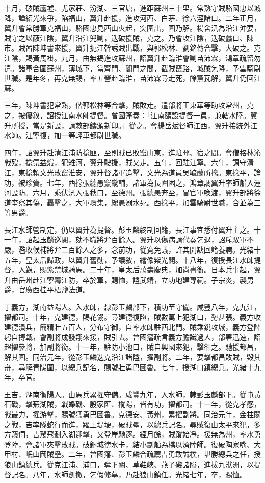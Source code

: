\begin{pinyinscope}
十月，破賊蘆墟、尤家莊、汾湖、三官塘，進距蘇州三十里。常熟守賊駱國忠以城降，譚紹光來爭，陷福山，翼升赴援，進攻河西、白茅、徐六涇諸口。二年正月，翼升會常勝軍克福山，駱國忠見西山火起，突圍出，圍乃解。楊舍汛為沿江沖要，賊守之以蔽江陰，翼升沿江兜剿，迭破援賊，克之。乃會攻江陰，迭破蠡口、陳市。賊酋陳坤書來援，翼升扼江幹誘賊出戰，與郭松林、劉銘傳合擊，大破之。克江陰，賜黃馬褂。九月，由無錫進攻蘇州，詔翼升赴臨淮會剿苗沛霖，鴻章疏留勿遣。諸軍合圍蘇州，薄城下，當齊門、閶門之間，截賊竄路，城賊乞降，予雲騎尉世職。是年冬，再克無錫，率五營赴臨淮，苗沛霖尋走死，餘黨瓦解，翼升仍回江蘇。

三年，陳坤書犯常熟，偕郭松林等合擊，賊敗走。遣部將王東華等助攻常州，克之，被優敘，詔授江南水師提督。曾國籓奏：「江南額設提督一員，兼轄水陸。翼升所授，當是新設，請敕部鑄頒新印。」從之。會楊岳斌督師江西，翼升接統外江水師。江寧復，加一等輕車都尉世職。

四年，詔翼升赴清江浦防捻匪，至則賊已敗竄山東，進駐邳、宿之間。會僧格林沁戰歿，捻氛益熾，犯雉河，翼升駛援，賊又走。五年，回駐江寧。六年，調守清江，東捻賴文光敗竄淮安，翼升督諸軍追擊，文光為道員吳毓蘭所擒。東捻平，論功，被珍賚。七年，西捻張總愚竄畿輔，諸軍為長圍困之，鴻章調翼升率師船入運河設防。六月，乘伏汛入張秋口，至德州。張總愚奔至，冒官軍喚渡，翼升部將徐道奎察其偽，轟擊之，大軍環集，總愚溺水死。西捻平，加雲騎尉世職，合並為三等男爵。

長江水師營制定，仍以翼升為提督。彭玉麟終制回籍，長江事宜悉付翼升主之。十一年，詔起玉麟巡閱，劾不職將弁百餘人。翼升以傷病請代奏乞退，詔斥馭軍不嚴，濫收候補將弁二百餘人之多，念前功，從寬免議，許其開缺回籍養痾。光緒十五年，皇太后歸政，以翼升舊勛，予議敘，繪像紫光閣。十八年，復授長江水師提督，入覲，賜紫禁城騎馬。二十年，皇太后萬壽慶典，加尚書銜。日本兵事起，翼升由岳州赴江寧籌江防，卒於軍，賜恤，謚武靖，立功地建專祠。子宗炎，襲男爵，官廣西桂平梧鹽法道。

丁義方，湖南益陽人。入水師，隸彭玉麟部下，積功至守備。咸豐八年，克九江，擢都司。十年，克建德，賜花翎。尋建德復陷，賊數萬上犯湖口，勢甚張。義方收建德潰兵，簡精壯五百人，分布守御，自率水師駐西北門。賊乘銳攻城，義方登陴躬自搏戰，會副將成發翔來援，賊引去。曾國籓疏言義方膽識過人，部署迅速，詔超擢參將，加副將銜。十一年，駐防小池口，賊自興國來犯，擊卻之。馳援都昌，解其圍。同治元年，從彭玉麟迭克沿江諸隘，擢副將。二年，要擊都昌敗賊，毀其舟，尋解青陽圍，以總兵記名，賜號壯勇巴圖魯。七年，授湖口鎮總兵。光緒十九年，卒官。

王吉，湖南衡陽人。由馬兵累擢守備。咸豐九年，入水師，隸彭玉麟部下。從屯黃石磯，擊蕪湖賊，戰蟂磯、殷家匯、樅陽，皆有功，擢都司。十一年，從克孝感，戰最力，擢游擊，賜號猛勇巴圖魯。克德安、黃州，累擢副將。同治元年，金柱關之戰，吉率隊蛇行而進，躍上堤埂，破賊壘，以總兵記名。尋賊復由太平來犯，多方窺伺，吉駕飛劃入湖迎擊，又登岸馳逐。經月餘，賊蹤始凈。援無為州，率水勇登陸，會諸軍夾擊敗賊。破銅城徬水卡，結小劃船為橋以濟陸師。復破陶家嘴、大甲村、岷山岡賊壘。二年，曾國籓、彭玉麟合疏薦吉勇敢誠樸，堪勝總兵之任，授狼山鎮總兵。從克江浦、浦口，奪下關、草鞋峽、燕子磯諸隘，進拔九洑洲，以提督記名。八年，水師凱撤，乞假修墓，乃赴狼山鎮任。光緒七年，卒，賜恤。


\end{pinyinscope}
